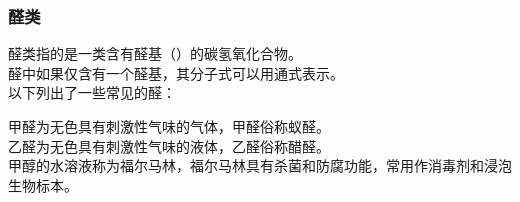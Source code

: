 \documentclass[UTF8]{ctexart}
\begin{document}
\subsubsection{醛类}
    醛类指的是一类含有醛基（）的碳氢氧化合物。\\[3mm]
    醛中如果仅含有一个醛基，其分子式可以用通式表示。\\[3mm]
    以下列出了一些常见的醛：\vspace{10pt}
    \begin{center}
        \qquad\quad
        \qquad\quad
    \end{center}\vspace{15pt}
    甲醛为无色具有刺激性气味的气体，甲醛俗称蚁醛。\\[3mm]
    乙醛为无色具有刺激性气味的液体，乙醛俗称醋醛。\\[3mm]
    甲醇的水溶液称为福尔马林，福尔马林具有杀菌和防腐功能，常用作消毒剂和浸泡生物标本。

\newpage
\end{document}
